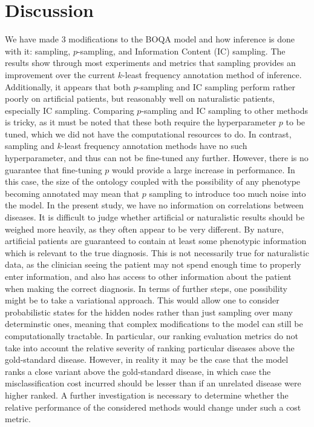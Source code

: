 \section{Discussion}
\label{sec:dis}
We have made 3 modifications to the BOQA model and how inference is done with it:
sampling, $p$-sampling, and Information Content (IC) sampling. The results show
through most experiments and metrics that sampling provides an improvement over
the current $k$-least frequency annotation method of inference. Additionally, it
appears that both $p$-sampling and IC sampling perform rather poorly on artificial
patients, but reasonably well on naturalistic patients, especially IC sampling.
%
Comparing $p$-sampling and IC sampling to other
methods is tricky, as it must be noted that these both require the hyperparameter $p$ to be tuned, which we did
not have the computational resources to do. In contrast, sampling and $k$-least 
frequency annotation methods have no such hyperparameter, and thus can not be fine-tuned
any further. However, there is no guarantee that fine-tuning $p$ would provide a large
increase in performance. In this case, the size of the ontology coupled with the possibility of any phenotype becoming annotated 
may mean that $p$ sampling to introduce too much noise into the model.
In the present study, we have no information on correlations between diseases.
%
It is difficult to judge whether artificial or naturalistic results should be weighed
more heavily, as they often appear to be very different. By nature, artificial patients
are guaranteed to contain at least some phenotypic information which is relevant to the 
true diagnosis. This is not necessarily true for naturalistic data, as the clinician seeing
the patient may not spend enough time to properly enter information, and also has access
to other information about the patient when making the correct diagnosis. 
%
In terms of further steps, one possibility might be to take a variational approach. This
would allow one to consider probabilistic states for the hidden nodes rather than just sampling
over many determinstic ones, meaning that complex modifications to the model can still be
computationally tractable. 
%
In particular, our ranking evaluation metrics do not take into account the
relative severity of ranking particular diseases above the gold-standard disease.
%
However, in reality it may be the case that the model ranks a close variant
above the gold-standard disease, in which case the misclassification cost
incurred should be lesser than if an unrelated disease were higher ranked.
%
A further investigation is necessary to determine whether the relative
performance of the considered methods would change under such a cost metric.
%


